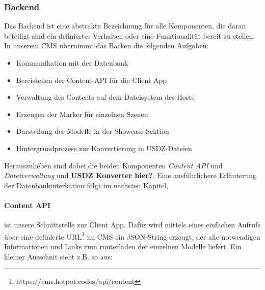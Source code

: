 \documentclass[titlepage, a4paper, 11pt]{scrartcl}
\begin{document}
      \subsubsection{Backend}

        Das Backend ist eine abstrakte Bezeichnung für alle Komponenten, die daran beteiligt sind ein definiertes Verhalten oder eine Funktionalität bereit zu stellen. 
        In unserem CMS übernimmt das Backen die folgenden Aufgaben:

        \begin{itemize}
          \item Kommunikation mit der Datenbank
          \item Bereistellen der Content-API für die Client App
          \item Verwaltung des Contents auf dem Dateisystem des Hosts
          \item Erzeugen der Marker für einzelnen Szenen
          \item Darstellung der Modelle in der Showcase Sektion
          \item Hintergrundprozess zur Konvertierung in USDZ-Dateien
        \end{itemize}

        Herauszuheben sind dabei die beiden Komponenten \textit{Content API} und \textit{Dateiverwaltung} und \textbf{USDZ Konverter hier?}. 
        Eine ausführlichere Erläuterung der Datenbankinterkation folgt im nächsten Kapitel,

        \paragraph{Content API} ist unsere Schnittstelle zur Client App. Dafür wird mittels eines einfachen Aufrufs über eine definierte URL\footnote{https://cms.hotpot.codes/api/content}
        im CMS ein JSON-String erzeugt, der alle notwendigen Informationen und Links zum runterladen der einzelnen Modelle liefert. Ein kleiner Ausschnit sieht z.B. so aus:
\end{document}
